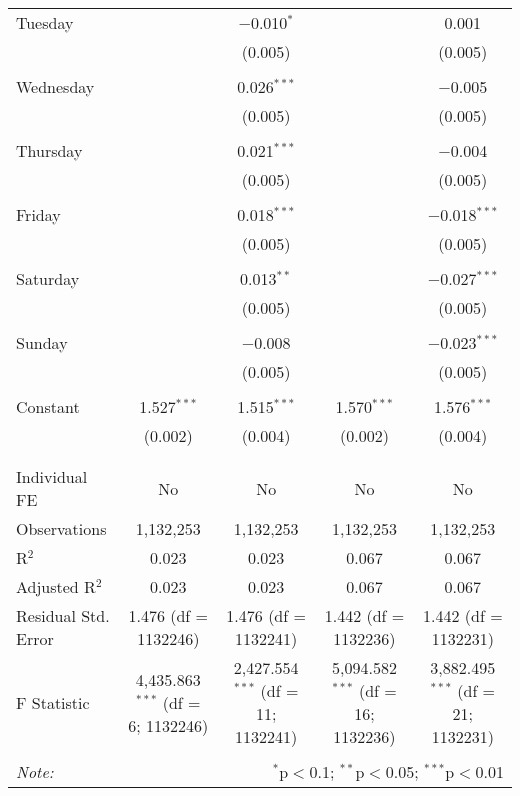 \documentclass[
]{article}
\begin{document}
\begin{table}[!htbp]
{\begin{tabular}{@{\extracolsep{5pt}}lcccc}
 Tuesday &  & $-$0.010$^{*}$ &  & 0.001 \\ 
  &  & (0.005) &  & (0.005) \\ 
  & & & & \\ 
 Wednesday &  & 0.026$^{***}$ &  & $-$0.005 \\ 
  &  & (0.005) &  & (0.005) \\ 
  & & & & \\ 
 Thursday &  & 0.021$^{***}$ &  & $-$0.004 \\ 
  &  & (0.005) &  & (0.005) \\ 
  & & & & \\ 
 Friday &  & 0.018$^{***}$ &  & $-$0.018$^{***}$ \\ 
  &  & (0.005) &  & (0.005) \\ 
  & & & & \\ 
 Saturday &  & 0.013$^{**}$ &  & $-$0.027$^{***}$ \\ 
  &  & (0.005) &  & (0.005) \\ 
  & & & & \\ 
 Sunday &  & $-$0.008 &  & $-$0.023$^{***}$ \\ 
  &  & (0.005) &  & (0.005) \\ 
  & & & & \\ 
 Constant & 1.527$^{***}$ & 1.515$^{***}$ & 1.570$^{***}$ & 1.576$^{***}$ \\ 
  & (0.002) & (0.004) & (0.002) & (0.004) \\ 
  & & & & \\ 
\hline \\[-1.8ex] 
Individual FE & No & No & No & No \\ 
Observations & 1,132,253 & 1,132,253 & 1,132,253 & 1,132,253 \\ 
R$^{2}$ & 0.023 & 0.023 & 0.067 & 0.067 \\ 
Adjusted R$^{2}$ & 0.023 & 0.023 & 0.067 & 0.067 \\ 
Residual Std. Error & 1.476 (df = 1132246) & 1.476 (df = 1132241) & 1.442 (df = 1132236) & 1.442 (df = 1132231) \\ 
F Statistic & 4,435.863$^{***}$ (df = 6; 1132246) & 2,427.554$^{***}$ (df = 11; 1132241) & 5,094.582$^{***}$ (df = 16; 1132236) & 3,882.495$^{***}$ (df = 21; 1132231) \\ 
\hline 
\hline \\[-1.8ex] 
\textit{Note:}  & \multicolumn{4}{r}{$^{*}$p$<$0.1; $^{**}$p$<$0.05; $^{***}$p$<$0.01} \\ 
\end{tabular}
} 
\end{table} 
\newpage
\end{document}
